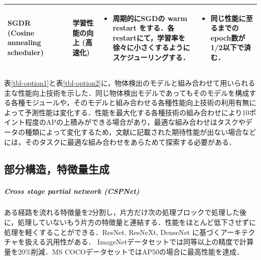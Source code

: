 \documentclass[twocolumn]{jsarticle} %
\begin{document}
\begin{table}
\begin{center}
\begin{tabularx}{\linewidth}{Xp{1.5cm}Xp{7cm}X}
            SGDR (Cosine annealing scheduler) & \cite{LoshHut17} & 学習性能の向上 (高速化) & 
            \begin{itemize}
                \vspace{-0.7\baselineskip}
                \setlength{\leftskip}{-3mm}
                \item 周期的にSGDの warm restart をする．各restartにて，学習率を徐々に小さくするようにスケジューリングする．
            \end{itemize}
            &
            \begin{itemize}
                \vspace{-0.7\baselineskip}
                \setlength{\leftskip}{-3mm}
                \item 同じ性能に至るまでのepoch数が1/2以下で済む．
            \end{itemize}
            \\

            \bottomrule
        \end{tabularx}
    \end{center}
\end{table}%

表\ref{tbl-option1}と表\ref{tbl-option2}に，物体検出のモデルと組み合わせて用いられる主な性能向上技術を示した．同じ物体検出モデルであってもそのモデルを構成する各種モジュールや，そのモデルと組み合わせる各種性能向上技術の利用有無によって予測性能は変化する．性能を最大化する各種技術の組み合わせにより10ポイント程度のAPの上積みができる場合があり，最適な組み合わせはタスクやデータの種類によって変化するため，文献に記載された期待性能が出ない場合などには，そのタスクに最適な組み合わせをあらためて探索する必要がある．

\subsection{部分構造，特徴量生成}
\subparagraph{Cross stage partial network (CSPNet) \cite{WLWCHY20}}ある経路を流れる特徴量を2分割し，片方だけ次の処理ブロックで処理した後に，処理していないもう片方の特徴量と連結する．性能をほとんど低下させずに処理を軽くすることができる．ResNet, ResNeXt, DenseNet に基づくアーキテクチャを扱える汎用性がある．
ImageNetデータセットでは同等以上の精度で計算量を20\%削減．MS COCOデータセットではAP50の場合に最高性能を達成．
\end{document}
